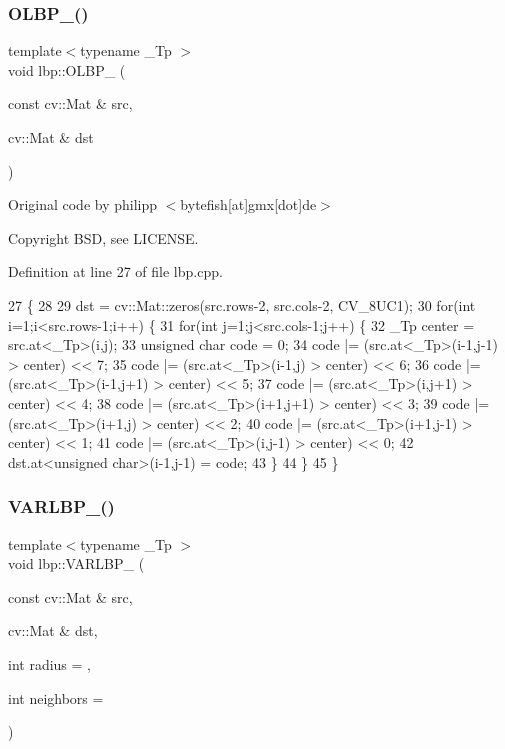 \subsubsection{\texorpdfstring{O\+L\+B\+P\+\_\+()}{OLBP\_()}}
{\footnotesize\ttfamily template$<$typename \+\_\+\+Tp $>$ \\
void lbp\+::\+O\+L\+B\+P\+\_\+ (\begin{DoxyParamCaption}\item[{const cv\+::\+Mat \&}]{src,  }\item[{cv\+::\+Mat \&}]{dst }\end{DoxyParamCaption})}



Original code by philipp $<$bytefish\mbox{[}at\mbox{]}gmx\mbox{[}dot\mbox{]}de$>$ 

\begin{DoxyCopyright}{Copyright}
B\+SD, see L\+I\+C\+E\+N\+SE. 
\end{DoxyCopyright}


Definition at line 27 of file lbp.\+cpp.


\begin{DoxyCode}
27                                             \{
28     
29     dst = cv::Mat::zeros(src.rows-2, src.cols-2, CV\_8UC1);
30     \textcolor{keywordflow}{for}(\textcolor{keywordtype}{int} i=1;i<src.rows-1;i++) \{
31         \textcolor{keywordflow}{for}(\textcolor{keywordtype}{int} j=1;j<src.cols-1;j++) \{
32             \_Tp center = src.at<\_Tp>(i,j);
33             \textcolor{keywordtype}{unsigned} \textcolor{keywordtype}{char} code = 0;
34             code |= (src.at<\_Tp>(i-1,j-1) > center) << 7;
35             code |= (src.at<\_Tp>(i-1,j) > center) << 6;
36             code |= (src.at<\_Tp>(i-1,j+1) > center) << 5;
37             code |= (src.at<\_Tp>(i,j+1) > center) << 4;
38             code |= (src.at<\_Tp>(i+1,j+1) > center) << 3;
39             code |= (src.at<\_Tp>(i+1,j) > center) << 2;
40             code |= (src.at<\_Tp>(i+1,j-1) > center) << 1;
41             code |= (src.at<\_Tp>(i,j-1) > center) << 0;
42             dst.at<\textcolor{keywordtype}{unsigned} \textcolor{keywordtype}{char}>(i-1,j-1) = code;
43         \}
44     \}
45 \}
\end{DoxyCode}
\mbox{\label{namespacelbp_a32baee0ff6f7c9703bc16f1e965e7324}} 
\subsubsection{\texorpdfstring{V\+A\+R\+L\+B\+P\+\_\+()}{VARLBP\_()}}
{\footnotesize\ttfamily template$<$typename \+\_\+\+Tp $>$ \\
void lbp\+::\+V\+A\+R\+L\+B\+P\+\_\+ (\begin{DoxyParamCaption}\item[{const cv\+::\+Mat \&}]{src,  }\item[{cv\+::\+Mat \&}]{dst,  }\item[{int}]{radius = {},  }\item[{int}]{neighbors = {} }\end{DoxyParamCaption})}


